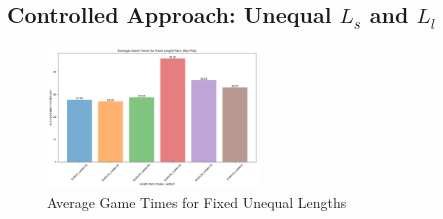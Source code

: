 \documentclass[12pt]{report}
\begin{document}
	\subsection{Controlled Approach: Unequal $L_{s}$ and $L_{l}$}
	\begin{figure}
		\centering
		\includegraphics[width=0.5\textwidth]{../withLength/UnequalLengths/approach_1_fixed_length_pairs_barplot}
		\caption{Average Game Times for Fixed Unequal Lengths}
		\label{fig:approach1fixedlengthpairsbarplot}
	\end{figure}	
\end{document}

